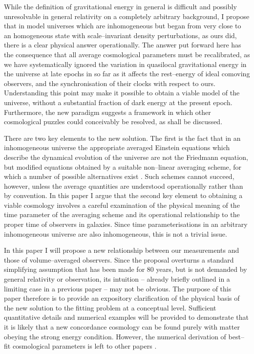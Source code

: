 \documentclass[12pt]{article}
\begin{document}
While the definition of gravitational energy in general is difficult and
possibly unresolvable in general relativity on a completely arbitrary
background, I propose that
in model universes which are inhomogeneous but began from very close to an
homogeneous state with scale--invariant density perturbations, as ours did,
there is a clear physical answer operationally. The answer put forward here
has the consequence that all average cosmological parameters must be
recalibrated, as we have systematically ignored the variation in quasilocal
gravitational energy in the universe at late epochs in so far as it
affects the rest--energy of ideal comoving observers, and the synchronisation
of their clocks with respect to ours. Understanding this point may make it
possible to obtain a viable model of the universe, without a substantial
fraction of dark energy at the present epoch. Furthermore, the new
paradigm suggests a framework in which other cosmological puzzles could
conceivably be resolved, as shall be discussed.

There are two key elements to the new solution. The first is the fact that
in an inhomogeneous universe the appropriate averaged Einstein equations
which describe the dynamical evolution of the universe are not the Friedmann
equation, but modified equations obtained by a suitable non--linear averaging
scheme, for which a number of possible alternatives exist \cite{buch1,Zal1}.
Such schemes cannot succeed, however, unless the average quantities
are understood operationally rather than by convention. In this paper
I argue that the second key element to obtaining a viable cosmology
involves a careful examination of the physical meaning of the time
parameter of the averaging scheme and its operational relationship to the
proper time of observers in galaxies. Since time parameterisations in an
arbitrary inhomogeneous universe are also inhomogeneous, this is not a
trivial issue.

In this paper I will propose a new relationship between
our measurements and those of volume--averaged observers.
Since the proposal overturns a standard simplifying assumption that
has been made for 80 years, but is not demanded by general relativity or
observation, its intuition -- already briefly outlined in a limiting case
in a previous paper \cite{paper0} -- may not be obvious. The purpose of
this paper therefore is to provide an expository clarification of the
physical basis of the new solution to the fitting problem
at a conceptual level. Sufficient quantitative details and numerical
examples will be
provided to demonstrate that it is likely that a new concordance
cosmology can be found purely with matter obeying the strong energy
condition. However, the numerical derivation of best--fit
cosmological parameters is left to other papers \cite{paper1,paper2}.
\end{document}
